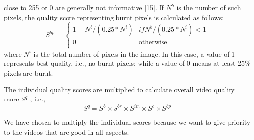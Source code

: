 \documentclass{sig-alternate-05-2015}
\begin{document}
\begin{itemize}
close to 255 or 0 are generally not informative [15]. If $N^b$
is the number of such pixels, the quality score representing
burnt pixels is calculated as follows:
\begin{equation}
S^{bp} = \left\{\begin{array}{ll}
    1-N^b/(0.25*N^i) & if N^b/(0.25*N^i)<1\\
    0 & \text{otherwise}\\
    \end{array}\right.
\end{equation}
where $N^i$ is the total number of pixels in the image. In this
case, a value of 1 represents best quality, i.e., no burnt pixels;
while a value of 0 means at least 25\% pixels are burnt.
\end{itemize}\par
The individual quality scores are multiplied to calculate overall
video quality score $S^q$ , i.e.,
\begin{equation}
    S^q = S^b\times S^{br}\times S^{im}\times S^c\times S^{bp}
\end{equation}\par
We have chosen to multiply the individual scores because we
want to give priority to the videos that are good in all aspects.
\end{document}
